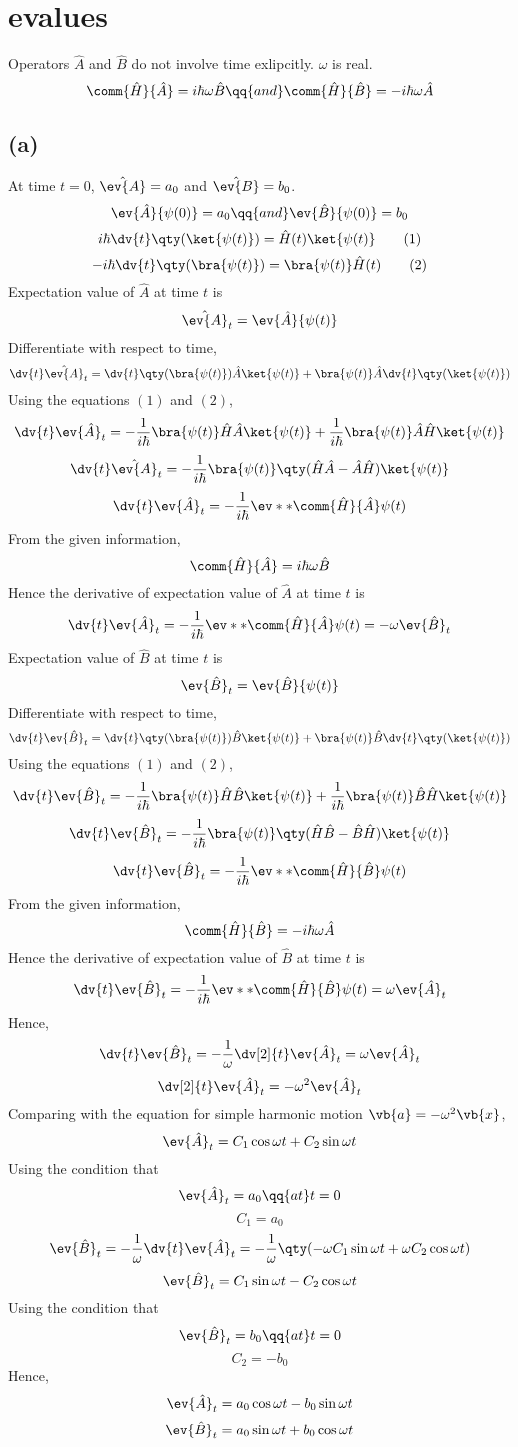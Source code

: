\section*{evalues}
Operators $\hat{A}$ and $\hat{B}$ do not involve time exlipcitly. $\omega$ is real.
\[\comm{\hat{H}}{\hat{A}}=i\hbar\omega\hat{B}\qq{and}\comm{\hat{H}}{\hat{B}}=-i\hbar\omega\hat{A}\]
\subsection*{(a)}
At time $t=0$, $\hat{\ev{A}}=a_0$ and $\hat{\ev{B}}=b_0$.
\[\ev{\hat{A}}{\psi(0)}=a_0\qq{and}\ev{\hat{B}}{\psi(0)}=b_0\]
\[i\hbar\dv{t}\qty(\ket{\psi(t)})=\hat{H}(t)\ket{\psi(t)}\tag{1}\]
\[-i\hbar\dv{t}\qty(\bra{\psi(t)})=\bra{\psi(t)}\hat{H}(t)\tag{2}\]
Expectation value of $\hat{A}$ at time $t$ is
\[\hat{\ev{A}}_t=\ev{\hat{A}}{\psi(t)}\]
Differentiate with respect to time,
\[\dv{t}\hat{\ev{A}}_t=\dv{t}\qty(\bra{\psi(t)})\hat{A}\ket{\psi(t)}+\bra{\psi(t)}\hat{A}\dv{t}\qty(\ket{\psi(t)})\]
Using the equations $(1)$ and $(2)$,
\[\dv{t}\ev{\hat{A}}_t=-\frac{1}{i\hbar}\bra{\psi(t)}\hat{H}\hat{A}\ket{\psi(t)}+\frac{1}{i\hbar}\bra{\psi(t)}\hat{A}\hat{H}\ket{\psi(t)}\]
\[\dv{t}\hat{\ev{A}}_t=-\frac{1}{i\hbar}\bra{\psi(t)}\qty(\hat{H}\hat{A}-\hat{A}\hat{H})\ket{\psi(t)}\]
\[\dv{t}\ev{\hat{A}}_t=-\frac{1}{i\hbar}\ev**{\comm{\hat{H}}{\hat{A}}}{\psi(t)}\]
From the given information,
\[\comm{\hat{H}}{\hat{A}}=i\hbar\omega\hat{B}\]
Hence the derivative of expectation value of $\hat{A}$ at time $t$ is
\[\dv{t}\ev{\hat{A}}_t=-\frac{1}{i\hbar}\ev**{\comm{\hat{H}}{\hat{A}}}{\psi(t)}=-\omega\ev{\hat{B}}_t\]
Expectation value of $\hat{B}$ at time $t$ is
\[\ev{\hat{B}}_t=\ev{\hat{B}}{\psi(t)}\]
Differentiate with respect to time,
\[\dv{t}\ev{\hat{B}}_t=\dv{t}\qty(\bra{\psi(t)})\hat{B}\ket{\psi(t)}+\bra{\psi(t)}\hat{B}\dv{t}\qty(\ket{\psi(t)})\]
Using the equations $(1)$ and $(2)$,
\[\dv{t}\ev{\hat{B}}_t=-\frac{1}{i\hbar}\bra{\psi(t)}\hat{H}\hat{B}\ket{\psi(t)}+\frac{1}{i\hbar}\bra{\psi(t)}\hat{B}\hat{H}\ket{\psi(t)}\]
\[\dv{t}\ev{\hat{B}}_t=-\frac{1}{i\hbar}\bra{\psi(t)}\qty(\hat{H}\hat{B}-\hat{B}\hat{H})\ket{\psi(t)}\]
\[\dv{t}\ev{\hat{B}}_t=-\frac{1}{i\hbar}\ev**{\comm{\hat{H}}{\hat{B}}}{\psi(t)}\]
From the given information,
\[\comm{\hat{H}}{\hat{B}}=-i\hbar\omega\hat{A}\]
Hence the derivative of expectation value of $\hat{B}$ at time $t$ is
\[\dv{t}\ev{\hat{B}}_t=-\frac{1}{i\hbar}\ev**{\comm{\hat{H}}{\hat{B}}}{\psi(t)}=\omega\ev{\hat{A}}_t\]
Hence,
\[\dv{t}\ev{\hat{B}}_t=-\frac{1}{\omega}\dv[2]{t}\ev{\hat{A}}_t=\omega\ev{\hat{A}}_t\]
\[\dv[2]{t}\ev{\hat{A}}_t=-\omega^2\ev{\hat{A}}_t\]
Comparing with the equation for simple harmonic motion $\vb{a}=-\omega^2\vb{x}$,
\[\ev{\hat{A}}_t=C_1\cos\omega t+C_2\sin\omega t\]
Using the condition that
\[\ev{\hat{A}}_t = a_0 \qq{at} t=0\]
\[C_1=a_0\]
\[\ev{\hat{B}}_t=-\frac{1}{\omega}\dv{t}\ev{\hat{A}}_t=-\frac{1}{\omega}\qty(-\omega C_1\sin\omega t+\omega C_2\cos\omega t)\]
\[\ev{\hat{B}}_t= C_1\sin\omega t- C_2\cos\omega t\]
Using the condition that
\[\ev{\hat{B}}_t = b_0 \qq{at} t=0\]
\[C_2=-b_0\]
Hence,
\[\ev{\hat{A}}_t= a_0\cos\omega t- b_0\sin\omega t\]
\[\ev{\hat{B}}_t= a_0\sin\omega t+ b_0\cos\omega t\]
